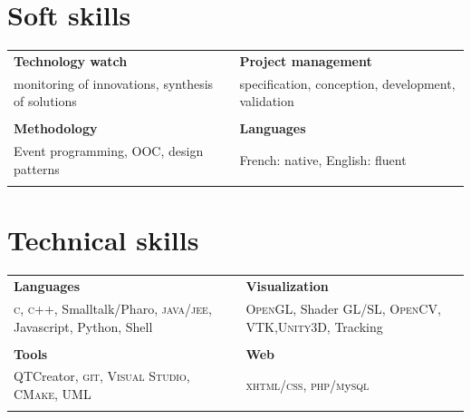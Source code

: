 \documentclass[9pt]{article}
\begin{document}
%
%
\hspace{-20pt}
\begin{minipage}[t]{0.47\textwidth}
	\vspace{-66pt} %
\section{Soft skills}
	\begin{tabular}{p{}p{}}
		\textbf{\small Technology watch} & \textbf{\small Project management} \\
		{\small monitoring of innovations, synthesis of solutions} & 
		{\small specification, conception, development, validation} \\ & \\
	
		\textbf{\small Methodology} & \textbf{\small Languages} \\
		{\small Event programming, OOC, design patterns} & 
		{\small French: native, English: fluent} \\ & \\
	
	\end{tabular}
\end{minipage} %
%
%
\hspace{15pt}
\begin{minipage}{0.45\textwidth}
\section{Technical skills}
\begin{tabular}{p{}p{}}
	\textbf{\small Languages} & \textbf{\small Visualization} \\
	{\small \textsc{c},  \textsc{c++}, Smalltalk/Pharo, \textsc{java/jee}, Javascript, Python, Shell} & 
	{\small \textsc{OpenGL}, Shader \textsc{GL/SL}, \textsc{OpenCV}, \textsc{VTK},\textsc{Unity3D}, Tracking}\\ & \\
	\textbf{\small Tools} & \textbf{\small Web} \\
	{\small \textsc QTCreator, \textsc{git}, \textsc{Visual Studio}, \textsc{CMake}, {UML}} & 
	{\small \textsc{xhtml/css}, \textsc{php}/\textsc{m}y\textsc{sql}} \\ & 
\end{tabular}
\end{minipage} %
\end{document}
